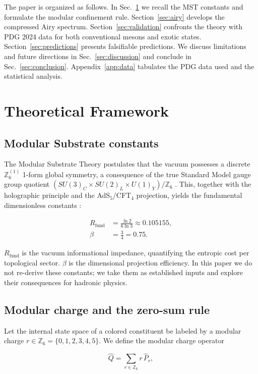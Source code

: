\documentclass[12pt,a4paper]{article}
\theoremstyle{plain}
\theoremstyle{definition}
\theoremstyle{remark}
\begin{document}
The paper is organized as follows. In Sec.~\ref{sec:theory} we recall the MST constants and formulate the modular confinement rule. Section~\ref{sec:airy} develops the compressed Airy spectrum. Section~\ref{sec:validation} confronts the theory with PDG 2024 data for both conventional mesons and exotic states. Section~\ref{sec:predictions} presents falsifiable predictions. We discuss limitations and future directions in Sec.~\ref{sec:discussion} and conclude in Sec.~\ref{sec:conclusion}. Appendix~\ref{app:data} tabulates the PDG data used and the statistical analysis.

\section{Theoretical Framework}
\label{sec:theory}

\subsection{Modular Substrate constants}
The Modular Substrate Theory postulates that the vacuum possesses a discrete \(\mathbb{Z}_6^{(1)}\) 1-form global symmetry, a consequence of the true Standard Model gauge group quotient \((SU(3)_C \times SU(2)_L \times U(1)_Y)/\mathbb{Z}_6\) \cite{aharony2013}. This, together with the holographic principle and the AdS\(_5\)/CFT\(_4\) projection, yields the fundamental dimensionless constants \cite{MSTfound}:

\begin{align}
R_{\text{fund}} &= \frac{\ln 2}{6\ln 3} \approx 0.105155, \label{eq:Rfund}\\
\beta &= \frac{3}{4} = 0.75. \label{eq:beta}
\end{align}

\(R_{\text{fund}}\) is the vacuum informational impedance, quantifying the entropic cost per topological sector. \(\beta\) is the dimensional projection efficiency. In this paper we do not re-derive these constants; we take them as established inputs and explore their consequences for hadronic physics.

\subsection{Modular charge and the zero-sum rule}
Let the internal state space of a colored constituent be labeled by a modular charge \(r \in \mathbb{Z}_6 = \{0,1,2,3,4,5\}\). We define the modular charge operator

\begin{equation}
\hat{Q} = \sum_{r \in \mathbb{Z}_6} r\, \hat{P}_r,
\label{eq:Qhat}
\end{equation}
\end{document}
